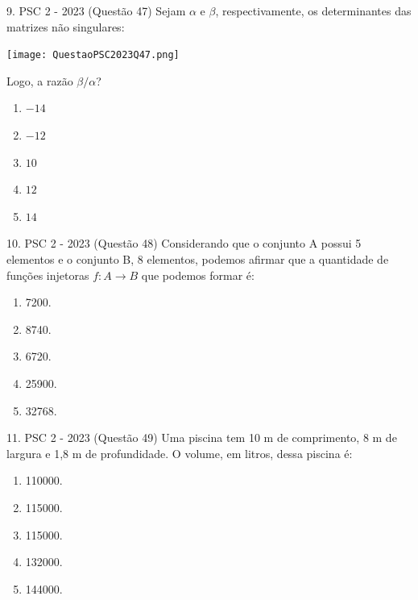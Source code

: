 \documentclass[aspectratio=169]{beamer}
\newif\ifusarcorvermelha
\newcommand{\vermelho}[1]{%
    \ifusarcorvermelha
        {\color{red}#1}%
    \else
        #1%
    \fi
}
\begin{document}
    \begin{frame}{9. PSC 2 - 2023 (Questão 47)}
      Sejam $\alpha$ e $\beta$, respectivamente, os determinantes das matrizes não singulares:

      \begin{center}
          \texttt{[image: QuestaoPSC2023Q47.png]}
      \end{center} Logo, a razão ${\beta}/{\alpha}$?
      
         \begin{enumerate}[a]
                    \item $-14$
                    \item \vermelho{$-12$} %
                    \item $10$
                    \item $12$
                    \item $14$
                \end{enumerate}        
    \end{frame}

     \begin{frame}{10. PSC 2 - 2023 (Questão 48)}
        Considerando que o conjunto A possui 5 elementos e o conjunto B, 8 elementos, podemos afirmar que a quantidade de funções injetoras $f:A \to B$ que podemos formar é:

         \begin{enumerate}[a]
                    \item 7200.
                    \item 8740.
                    \item \vermelho{6720.} %
                    \item 25900.
                    \item 32768.
                \end{enumerate}        
    \end{frame}

     \begin{frame}{11. PSC 2 - 2023 (Questão 49)}
        Uma piscina tem 10 m de comprimento, 8 m de largura e 1,8 m de profundidade. O volume, em litros, dessa piscina é:

         \begin{enumerate}[a]
                    \item 110000.
                    \item 115000.
                    \item 115000.
                    \item 132000.
                    \item \vermelho{144000.} %
                \end{enumerate}        
    \end{frame}
\end{document}
